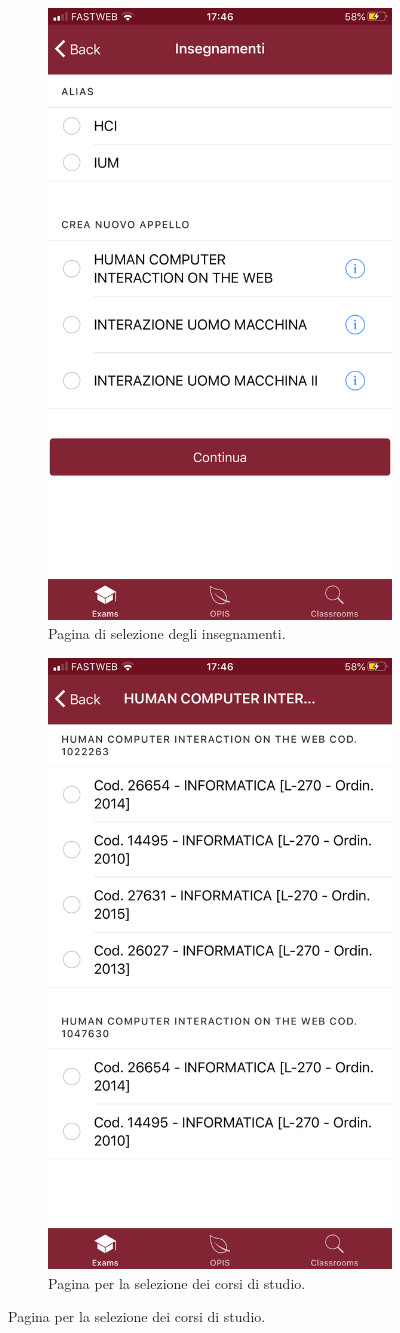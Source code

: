 \documentclass[Lau, oneside, noexaminfo]{sapthesis}%
\begin{document}
\begin{figure}[H]
\begin{subfigure}{0.6\textwidth}
	  \includegraphics[width=0.5\linewidth]{ui-iterations/i/select-teaching}  
	  \caption{Pagina di selezione degli insegnamenti.}
	  \label{fig:sub-second}
	\end{subfigure}
	\begin{subfigure}{0.6\textwidth}
		\centering
		\includegraphics[width=0.5\linewidth]{ui-iterations/i/select-program}  
		\caption{Pagina per la selezione dei corsi di studio.}

\end{subfigure}
\end{figure}
\end{document}
